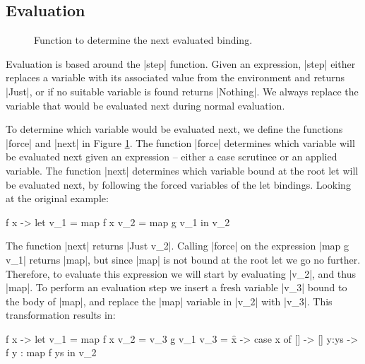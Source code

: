 \documentclass[draft]{sigplanconf}
\begin{document}
\subsection{Evaluation}
\label{sec:eval}

\begin{figure}
\caption{Function to determine the next evaluated binding.}
\label{fig:stack}
\end{figure}

Evaluation is based around the |step| function. Given an expression, |step| either replaces a variable with its associated value from the environment and returns |Just|, or if no suitable variable is found returns |Nothing|. We always replace the variable that would be evaluated next during normal evaluation.

To determine which variable would be evaluated next, we define the functions |force| and |next| in Figure \ref{fig:stack}. The function |force| determines which variable will be evaluated next given an expression -- either a case scrutinee or an applied variable. The function |next| determines which variable bound at the root let will be evaluated next, by following the forced variables of the let bindings. Looking at the original example:

\begin{code}
\g f x ->  let  v_1 =  map f x
                v_2 =  map g v_1
           in   v_2
\end{code}

The function |next| returns |Just v_2|. Calling |force| on the expression |map g v_1| returns |map|, but since |map| is not bound at the root let we go no further. Therefore, to evaluate this expression we will start by evaluating |v_2|, and thus |map|. To perform an evaluation step we insert a fresh variable |v_3| bound to the body of |map|, and replace the |map| variable in |v_2| with |v_3|. This transformation results in:

\begin{code}
\g f x ->  let  v_1 =  map f x
                v_2 =  v_3 g v_1
                v_3 =  \f x -> case  x of
                                     []    -> []
                                     y:ys  -> f y : map f ys
           in   v_2
\end{code}
\end{document}

